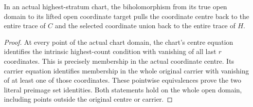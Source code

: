 \begin{lemma}
\label{hir:general-nc-first-step-whole-chart-data}
\leanok
{}
In an actual highest-stratum chart, the biholomorphism from its true
open domain to its lifted open coordinate target pulls the coordinate
centre back to the entire trace of $C$ and the selected coordinate union
back to the entire trace of $H$.
\end{lemma}
\begin{proof}
At every point of the actual chart domain, the chart's centre equation
identifies the intrinsic highest-count condition with vanishing of all
last $r$ coordinates. This is precisely membership in the actual coordinate
centre. Its carrier equation identifies membership in the whole original
carrier with vanishing of at least one of those coordinates. These
pointwise equivalences prove the two literal preimage set identities.
Both statements hold on the whole open domain, including points outside
the original centre or carrier.
\end{proof}

